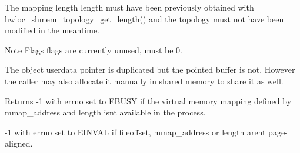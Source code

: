 The mapping length {\ttfamily length} must have been previously obtained with \hyperlink{a00226_ga772ab52750cdd0eec85128df24888001}{hwloc\+\_\+shmem\+\_\+topology\+\_\+get\+\_\+length()} and the topology must not have been modified in the meantime.

\begin{DoxyNote}{Note}
Flags {\ttfamily flags} are currently unused, must be 0.

The object userdata pointer is duplicated but the pointed buffer is not. However the caller may also allocate it manually in shared memory to share it as well.
\end{DoxyNote}
\begin{DoxyReturn}{Returns}
-\/1 with errno set to E\+B\+U\+SY if the virtual memory mapping defined by {\ttfamily mmap\+\_\+address} and {\ttfamily length} isn\textquotesingle{}t available in the process. 

-\/1 with errno set to E\+I\+N\+V\+AL if {\ttfamily fileoffset}, {\ttfamily mmap\+\_\+address} or {\ttfamily length} aren\textquotesingle{}t page-\/aligned. 
\end{DoxyReturn}
